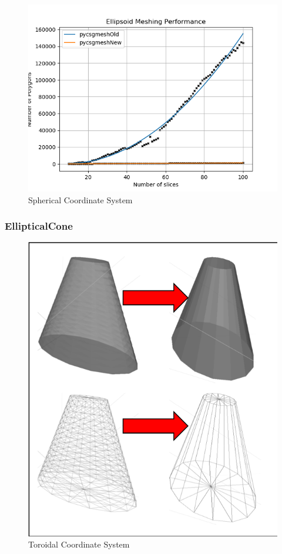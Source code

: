 \documentclass[12pt,a4paper]{article}
\begin{document}
\begin{figure}[h!]
\centering
\includegraphics[scale=0.5]{Images//Quad_fits//Ellipsoid_quad.png}
\caption[width=\columnwidth]{Spherical Coordinate System}
\label{conts}
\end{figure}


\newpage
\subsubsection{EllipticalCone}

\begin{figure}[h!]
\centering
\includegraphics[scale=0.5]{Images//Meshes//ellipticalcone.png}
\caption[width=\columnwidth]{Toroidal Coordinate System}
\label{conts}
\end{figure}
\end{document}
